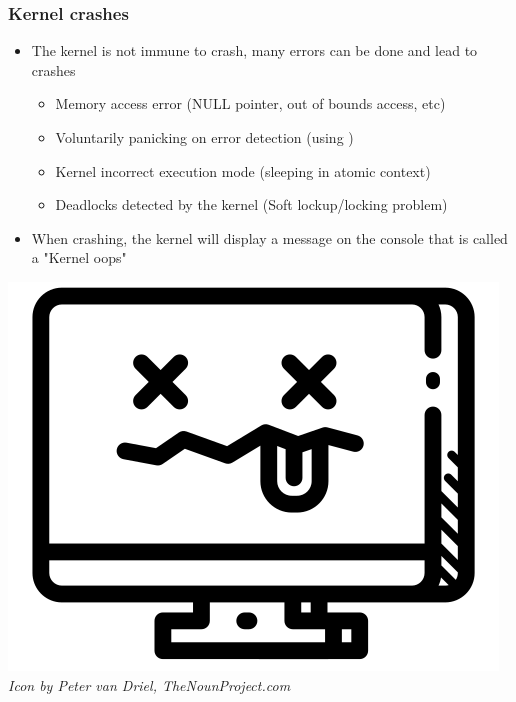 \begin{frame}
  \frametitle{Kernel crashes}
  \begin{itemize}
    \item The kernel is not immune to crash, many errors can be done and lead to
          crashes
    \begin{itemize}
      \item Memory access error (NULL pointer, out of bounds access, etc)
      \item Voluntarily panicking on error detection (using )
      \item Kernel incorrect execution mode (sleeping in atomic context)
      \item Deadlocks detected by the kernel (Soft lockup/locking problem)
    \end{itemize}
    \item When crashing, the kernel will display a message on the console that
          is called a "Kernel oops"
  \end{itemize}
  \begin{center}
    \center\includegraphics[height=0.3\textheight]{slides/debugging-kernel-debugging/crash.png}\\
    {\tiny {\em Icon by Peter van Driel, TheNounProject.com}}
  \end{center}
\end{frame}

